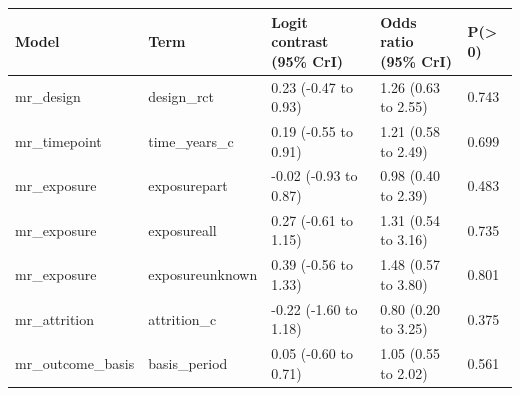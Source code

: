 
\begin{tabular}{lllll}
\toprule
Model & Term & Logit contrast (95\% CrI) & Odds ratio (95\% CrI) & P(> 0)\\
\midrule
mr\_design & design\_rct & 0.23 (-0.47 to 0.93) & 1.26 (0.63 to 2.55) & 0.743\\
mr\_timepoint & time\_years\_c & 0.19 (-0.55 to 0.91) & 1.21 (0.58 to 2.49) & 0.699\\
mr\_exposure & exposurepart & -0.02 (-0.93 to 0.87) & 0.98 (0.40 to 2.39) & 0.483\\
mr\_exposure & exposureall & 0.27 (-0.61 to 1.15) & 1.31 (0.54 to 3.16) & 0.735\\
mr\_exposure & exposureunknown & 0.39 (-0.56 to 1.33) & 1.48 (0.57 to 3.80) & 0.801\\
mr\_attrition & attrition\_c & -0.22 (-1.60 to 1.18) & 0.80 (0.20 to 3.25) & 0.375\\
mr\_outcome\_basis & basis\_period & 0.05 (-0.60 to 0.71) & 1.05 (0.55 to 2.02) & 0.561\\
\bottomrule
\end{tabular}

